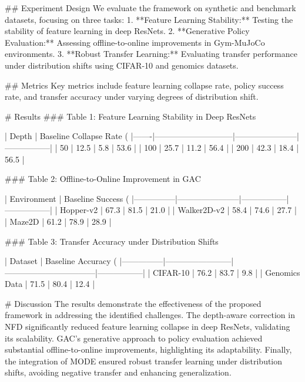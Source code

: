 ## Experiment Design  
We evaluate the framework on synthetic and benchmark datasets, focusing on three tasks:  
1. **Feature Learning Stability:** Testing the stability of feature learning in deep ResNets.  
2. **Generative Policy Evaluation:** Assessing offline-to-online improvements in Gym-MuJoCo environments.  
3. **Robust Transfer Learning:** Evaluating transfer performance under distribution shifts using CIFAR-10 and genomics datasets.

## Metrics  
Key metrics include feature learning collapse rate, policy success rate, and transfer accuracy under varying degrees of distribution shift.

# Results  
### Table 1: Feature Learning Stability in Deep ResNets  

| Depth | Baseline Collapse Rate (%
|-------|-----------------------------|-----------------------|-----------------|  
| 50    | 12.5                        | 5.8                   | 53.6            |  
| 100   | 25.7                        | 11.2                  | 56.4            |  
| 200   | 42.3                        | 18.4                  | 56.5            |  

### Table 2: Offline-to-Online Improvement in GAC  

| Environment   | Baseline Success (%
|---------------|-----------------------|-----------------|-----------------|  
| Hopper-v2     | 67.3                 | 81.5            | 21.0            |  
| Walker2D-v2   | 58.4                 | 74.6            | 27.7            |  
| Maze2D         | 61.2                 | 78.9            | 28.9            |  

### Table 3: Transfer Accuracy under Distribution Shifts  

| Dataset       | Baseline Accuracy (%
|---------------|------------------------|---------------------------------|-----------------|  
| CIFAR-10      | 76.2                  | 83.7                            | 9.8             |  
| Genomics Data | 71.5                  | 80.4                            | 12.4            |  

# Discussion  
The results demonstrate the effectiveness of the proposed framework in addressing the identified challenges. The depth-aware correction in NFD significantly reduced feature learning collapse in deep ResNets, validating its scalability. GAC's generative approach to policy evaluation achieved substantial offline-to-online improvements, highlighting its adaptability. Finally, the integration of MODE ensured robust transfer learning under distribution shifts, avoiding negative transfer and enhancing generalization.

